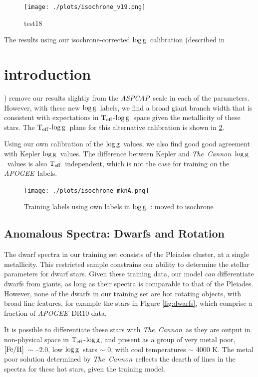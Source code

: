 \documentclass[12pt, preprint]{aastex}
\newcommand{\teff}{\mbox{$\rm T_{eff}$}}
\newcommand{\feh}{\mbox{$\rm [Fe/H]$}}
\newcommand{\logg}{\mbox{$\rm \log g$}}
\newcommand{\tc}{\textsl{The~Cannon}}
\newcommand{\apogee}{\textsl{APOGEE}}
\newcommand{\aspcap}{\textsl{ASPCAP}}
\begin{document}
\begin{figure}[h!]
  \texttt{[image: ./plots/isochrone\_v19.png]}
\caption{test18}
\label{fig:test18}
\end{figure}

The results using our isochrone-corrected \logg\ calibration (described in \section{introduction}) remove our results slightly from the \aspcap\ scale in each of the parameters. However, with these new \logg\ labels, we find a broad giant branch width that is consistent with expectations in \teff-\logg\ space given the metallicity of these stars. The \teff-\logg\ plane for this alternative calibration is shown in \ref{fig:mknA}. 

Using our own calibration of the \logg\ values, we also find good  good agreement with Kepler \logg\ values. The difference between Kepler and \tc\ \logg\ values is also \teff\ independent, which is not the case for training on the \apogee\ labels. 


\begin{figure}[h!]
  \texttt{[image: ./plots/isochrone\_mknA.png]}
\caption{Training labels using own labels in \logg\ : moved to isochrone}
\label{fig:mknA}
\end{figure}

\subsection{Anomalous Spectra: Dwarfs and Rotation}

The dwarf spectra in our training set consists of the Pleiades cluster, at a single metallicity. This restricted sample constrains our ability to determine the stellar parameters for dwarf stars. Given these training data, our model \textit{can} differentiate dwarfs from giants, as long as their spectra is comparable to that of the Pleiades. However, none of the dwarfs in our training set are hot rotating objects, with broad line features, for example the stars in Figure \ref{fig:dwarfs}, which comprise a fraction of \apogee\ DR10 data. 

It is possible to differentiate these stars with \tc\, as they are output in non-physical space in \teff-\logg, and present as a group of very metal poor, \feh\ $\sim$ --2.0, low \logg\ stars $\sim$ 0, with cool temperatures $\sim$ 4000 K. The metal poor solution determined by \tc\ reflects the dearth of lines in the spectra for these hot stars, given the training model. 
\end{document}
